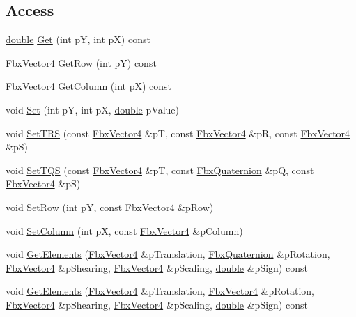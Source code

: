 \subsection*{Access}
\begin{DoxyCompactItemize}
\item 
\hyperlink{class_fbx_matrix_a01f8be57393e5d9973b23897c29d5520}{double} \hyperlink{class_fbx_matrix_a4efcbbd102b39375a1415b496c302ada}{Get} (int pY, int pX) const
\item 
\hyperlink{class_fbx_vector4}{Fbx\+Vector4} \hyperlink{class_fbx_matrix_a753fd8b28ef58c5e6601e41b1a6e4a56}{Get\+Row} (int pY) const
\item 
\hyperlink{class_fbx_vector4}{Fbx\+Vector4} \hyperlink{class_fbx_matrix_a1954028d6d499f4e5abb3395dd44b973}{Get\+Column} (int pX) const
\item 
void \hyperlink{class_fbx_matrix_a960df088b3de9b92b6d1a0a5a7c92f96}{Set} (int pY, int pX, \hyperlink{class_fbx_matrix_a01f8be57393e5d9973b23897c29d5520}{double} p\+Value)
\item 
void \hyperlink{class_fbx_matrix_a253b113324411e4207128ec8a8c5615a}{Set\+T\+RS} (const \hyperlink{class_fbx_vector4}{Fbx\+Vector4} \&pT, const \hyperlink{class_fbx_vector4}{Fbx\+Vector4} \&pR, const \hyperlink{class_fbx_vector4}{Fbx\+Vector4} \&pS)
\item 
void \hyperlink{class_fbx_matrix_ab6dfb720064c2d0b289deadccdd05b59}{Set\+T\+QS} (const \hyperlink{class_fbx_vector4}{Fbx\+Vector4} \&pT, const \hyperlink{class_fbx_quaternion}{Fbx\+Quaternion} \&pQ, const \hyperlink{class_fbx_vector4}{Fbx\+Vector4} \&pS)
\item 
void \hyperlink{class_fbx_matrix_a0bb42e2e2674690feb0ba822c935df0e}{Set\+Row} (int pY, const \hyperlink{class_fbx_vector4}{Fbx\+Vector4} \&p\+Row)
\item 
void \hyperlink{class_fbx_matrix_a574c58718a4e83c822ac226e20d1bd9e}{Set\+Column} (int pX, const \hyperlink{class_fbx_vector4}{Fbx\+Vector4} \&p\+Column)
\item 
void \hyperlink{class_fbx_matrix_ac3746a3f250c31b261b92131f3658dc5}{Get\+Elements} (\hyperlink{class_fbx_vector4}{Fbx\+Vector4} \&p\+Translation, \hyperlink{class_fbx_quaternion}{Fbx\+Quaternion} \&p\+Rotation, \hyperlink{class_fbx_vector4}{Fbx\+Vector4} \&p\+Shearing, \hyperlink{class_fbx_vector4}{Fbx\+Vector4} \&p\+Scaling, \hyperlink{class_fbx_matrix_a01f8be57393e5d9973b23897c29d5520}{double} \&p\+Sign) const
\item 
void \hyperlink{class_fbx_matrix_a4f2ed6466e4887e6ebd30af2f4cda963}{Get\+Elements} (\hyperlink{class_fbx_vector4}{Fbx\+Vector4} \&p\+Translation, \hyperlink{class_fbx_vector4}{Fbx\+Vector4} \&p\+Rotation, \hyperlink{class_fbx_vector4}{Fbx\+Vector4} \&p\+Shearing, \hyperlink{class_fbx_vector4}{Fbx\+Vector4} \&p\+Scaling, \hyperlink{class_fbx_matrix_a01f8be57393e5d9973b23897c29d5520}{double} \&p\+Sign) const
\end{DoxyCompactItemize}
